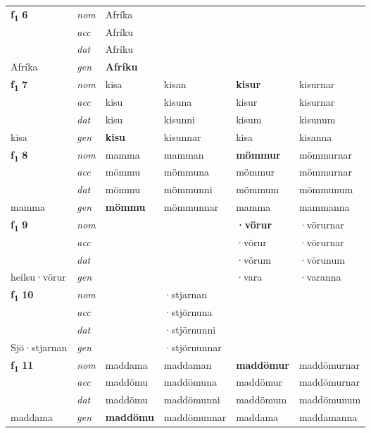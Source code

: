 \begin{longtable}[l]{X>{\footnotesize\itshape}XXXXX}
\multirow{3}{*}{{{\textbf{f{\textsubscript{1}}} \Large{\textbf{6}}}}} & nom & Afríka &  & \textbf{} &  \\*
 & acc & Afríku &  &  &  \\*
 & dat & Afríku &  &  &  \\*
 {\footnotesize{Afríka}} & gen & \textbf{Afríku} &  &  &  \\
\midrule

\multirow{3}{*}{{{\textbf{f{\textsubscript{1}}} \Large{\textbf{7}}}}} & nom & kisa & kisan & \textbf{kisur} & kisurnar \\*
 & acc & kisu & kisuna & kisur & kisurnar \\*
 & dat & kisu & kisunni & kisum & kisunum \\*
 {\footnotesize{kisa}} & gen & \textbf{kisu} & kisunnar & kisa & kisanna \\
\midrule

\multirow{3}{*}{{{\textbf{f{\textsubscript{1}}} \Large{\textbf{8}}}}} & nom & mamma & mamman & \textbf{mömmur} & mömmurnar \\*
 & acc & mömmu & mömmuna & mömmur & mömmurnar \\*
 & dat & mömmu & mömmunni & mömmum & mömmunum \\*
 {\footnotesize{mamma}} & gen & \textbf{mömmu} & mömmunnar & mamma & mammanna \\
\midrule

\multirow{3}{*}{{{\textbf{f{\textsubscript{1}}} \Large{\textbf{9}}}}} & nom &  &  & \textbf{·vörur} & ·vörurnar \\*
 & acc &  &  & ·vörur & ·vörurnar \\*
 & dat &  &  & ·vörum & ·vörunum \\*
 {\footnotesize{heilsu\allowbreak ·vörur}} & gen & \textbf{} &  & ·vara & ·varanna \\
\midrule

\multirow{3}{*}{{{\textbf{f{\textsubscript{1}}} \Large{\textbf{10}}}}} & nom &  & ·stjarnan & \textbf{} &  \\*
 & acc &  & ·stjörnuna &  &  \\*
 & dat &  & ·stjörnunni &  &  \\*
 {\footnotesize{Sjö\allowbreak ·stjarnan}} & gen & \textbf{} & ·stjörnunnar &  &  \\
\midrule

\multirow{3}{*}{{{\textbf{f{\textsubscript{1}}} \Large{\textbf{11}}}}} & nom & maddama & maddaman & \textbf{maddömur} & maddömurnar \\*
 & acc & maddömu & maddömuna & maddömur & maddömurnar \\*
 & dat & maddömu & maddömunni & maddömum & maddömunum \\*
 {\footnotesize{maddama}} & gen & \textbf{maddömu} & maddömunnar & maddama & maddamanna \\
\midrule


\end{longtable}
